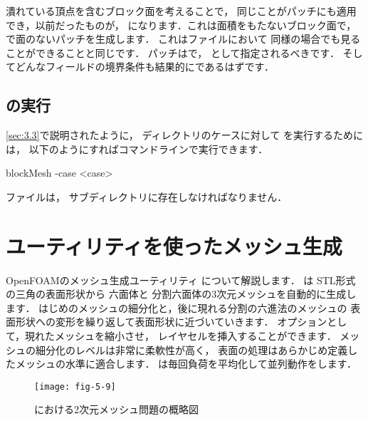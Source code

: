 潰れている頂点を含むブロック面を考えることで，
同じことがパッチにも適用でき，以前だったものが，
になります．これは面積をもたないブロック面で，
で面のないパッチを生成します．
これはファイルにおいて
同様の場合でも見ることができることと同じです．
パッチはで，
として指定されるべきです．
そしてどんなフィールドの境界条件も結果的にであるはずです．


\subsection{の実行}
\label{ssec:5.3.4}
\autoref{sec:3.3}で説明されたように，
ディレクトリのケースに対して
を実行するためには，
以下のようにすればコマンドラインで実行できます．
\begin{OFverbatim}[terminal]
blockMesh -case <case>
\end{OFverbatim}
%
%
ファイルは，
サブディレクトリに存在しなければなりません．



\section{ユーティリティを使ったメッシュ生成}
\label{sec:5.4}
%
%
%
OpenFOAMのメッシュ生成ユーティリティ
について解説します．
は
%
STL形式の三角の表面形状から
六面体と
%
分割六面体の3次元メッシュを自動的に生成します．
はじめのメッシュの細分化と，後に現れる分割の六進法のメッシュの
%
表面形状への変形を繰り返して表面形状に近づいていきます．
オプションとして，現れたメッシュを縮小させ，
レイヤセルを挿入することができます．
メッシュの細分化のレベルは非常に柔軟性が高く，
表面の処理はあらかじめ定義したメッシュの水準に適合します．
は毎回負荷を平均化して並列動作をします．


\begin{figure}[ht]
 \texttt{[image: fig-5-9]}
 \caption{における2次元メッシュ問題の概略図}
 \label{fig:5.9}
\end{figure}


